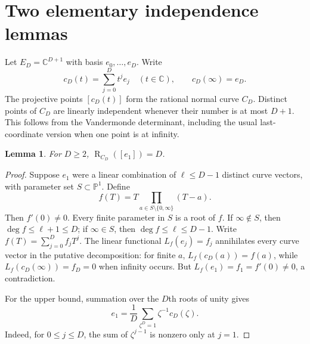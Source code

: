 \documentclass[11pt]{article}
\newtheorem{lemma}[theorem]{Lemma}
\theoremstyle{remark}\newtheorem{remark}[theorem]{Remark}
\newcommand{\C}{\mathbb C}
\newcommand{\PP}{\mathbb P}
\newcommand{\rk}{\operatorname{R}}
\begin{document}
\section{Two elementary independence lemmas}
Let $E_D=\C^{D+1}$ with basis $e_0,\ldots,e_D$. Write
\[
 c_D(t)=\sum_{j=0}^D t^j e_j\quad(t\in\C),\qquad c_D(\infty)=e_D.
\]
The projective points $[c_D(t)]$ form the rational normal curve $C_D$. Distinct points of $C_D$ are linearly independent whenever their number is at most $D+1$. This follows from the Vandermonde determinant, including the usual last-coordinate version when one point is at infinity.

\begin{lemma}\label{lem:tangent}
For $D\geq2$, $\rk_{C_D}([e_1])=D$.
\end{lemma}
\begin{proof}
Suppose $e_1$ were a linear combination of $\ell\leq D-1$ distinct curve vectors, with parameter set $S\subset\PP^1$. Define
\[
 f(T)=T\prod_{a\in S\setminus\{0,\infty\}}(T-a).
\]
Then $f'(0)\neq0$. Every finite parameter in $S$ is a root of $f$.
If $\infty\notin S$, then $\deg f\leq\ell+1\leq D$; if $\infty\in S$, then $\deg f\leq\ell\leq D-1$.
Write $f(T)=\sum_{j=0}^D f_jT^j$. The linear functional $L_f(e_j)=f_j$ annihilates every curve vector in the putative decomposition: for finite $a$, $L_f(c_D(a))=f(a)$, while $L_f(c_D(\infty))=f_D=0$ when infinity occurs. But $L_f(e_1)=f_1=f'(0)\neq0$, a contradiction.

For the upper bound, summation over the $D$th roots of unity gives
\[
 e_1=\frac1D\sum_{\zeta^D=1}\zeta^{-1}c_D(\zeta).
\]
Indeed, for $0\leq j\leq D$, the sum of $\zeta^{j-1}$ is nonzero only at $j=1$.
\end{proof}
\end{document}
